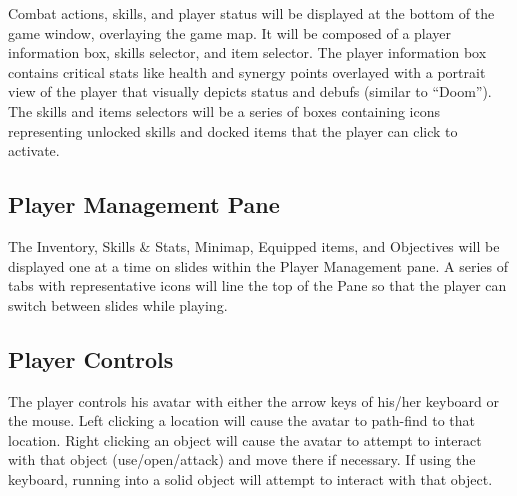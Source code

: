 \documentclass[11pt]{article}
\begin{document}
	Combat actions, skills, and player status will be displayed at the bottom of the game window, overlaying the game map. It will be composed of a player information box, skills selector, and item selector.
	The player information box contains critical stats like health and synergy points overlayed with a portrait view of the player that visually depicts status and debufs  (similar to ``Doom'').
	The skills and items selectors will be a series of boxes containing icons representing unlocked skills and docked items that the player can click to activate.

	\subsection{Player Management Pane}
	The Inventory, Skills \& Stats, Minimap, Equipped items, and Objectives will be displayed one at a time on slides within the Player Management pane.
	A series of tabs with representative icons will line the top of the Pane so that the player can switch between slides while playing.

	\subsection{Player Controls}
	The player controls his avatar with either the arrow keys of his/her keyboard or the mouse. Left clicking a location will cause the avatar to path-find to that location.
	Right clicking an object will cause the avatar to attempt to interact with that object (use/open/attack) and move there if necessary.
	If using the keyboard, running into a solid object will attempt to interact with that object.
\end{document}
